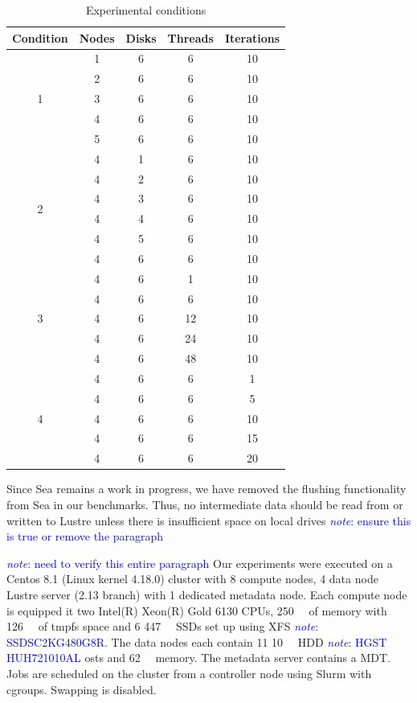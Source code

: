 \documentclass{report}
\newcommand{\note}[1]{\textcolor{blue}{\textit{note}: #1}}
\begin{document}
    \begin{table}[h!]
    \centering
    \begin{tabular}{|c|c|c|c|c|} 
     \hline
     Condition & Nodes & Disks & Threads & Iterations \\
     \hline
     \multirow{5}{*}{1} & 1 & 6 & 6 & 10 \\ 
     & 2 & 6 & 6 & 10 \\ 
     & 3 & 6 & 6 & 10 \\ 
     & 4 & 6 & 6 & 10 \\ 
     & 5 & 6 & 6 & 10 \\ 
     \hline
     \multirow{6}{*}{2} & 4 & 1 & 6 & 10 \\ 
     & 4 & 2 & 6 & 10 \\
     & 4 & 3 & 6 & 10 \\
     & 4 & 4 & 6 & 10 \\
     & 4 & 5 & 6 & 10 \\
     & 4 & 6 & 6 & 10 \\
     \hline
     \multirow{5}{*}{3} & 4 & 6 & 1 & 10 \\ 
     & 4 & 6 & 6 & 10 \\
     & 4 & 6 & 12 & 10 \\
     & 4 & 6 & 24 & 10 \\
     & 4 & 6 & 48 & 10 \\
     \hline
     \multirow{5}{*}{4} & 4 & 6 & 6 & 1 \\ 
     & 4 & 6 & 6 & 5 \\
     & 4 & 6 & 6 & 10 \\
     & 4 & 6 & 6 & 15 \\
     & 4 & 6 & 6 & 20 \\
     \hline

    \end{tabular}
    \caption{Experimental conditions}
    \label{table:cond}
    \end{table}

    Since Sea remains a work in progress, we have removed the flushing functionality
    from Sea in our benchmarks. Thus, no intermediate data should be read from or 
    written to Lustre unless there is insufficient space on local drives \note{ensure
    this is true or remove the paragraph}

    \note{need to verify this entire paragraph}
    Our experiments were executed on a Centos 8.1 (Linux kernel 4.18.0) cluster with 8 compute nodes,
    4 data node Lustre server (2.13 branch) with 1 dedicated metadata node. Each compute node
    is equipped it two Intel(R) Xeon(R) Gold 6130 CPUs, \SI{250}{\gibi\byte} of memory with
    \SI{126}{\gibi\byte} of tmpfs space and 6 \SI{447}{\gibi\byte} SSDs set up using XFS \note{SSDSC2KG480G8R}.
    The data nodes each contain 11 \SI{10}{\tera\byte} HDD \note{HGST HUH721010AL} \gls{ost}s
    and \SI{62}{\gibi\byte} memory. The metadata server contains a MDT.
    Jobs are scheduled on the cluster from a controller node using Slurm with cgroups. Swapping is
    disabled.
\end{document}
